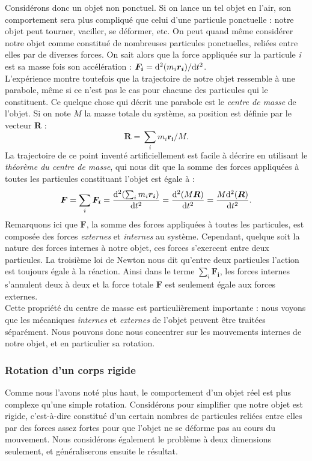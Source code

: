 Considérons donc un objet non ponctuel. Si on lance un tel objet en l'air, son comportement sera plus compliqué que celui d'une particule ponctuelle : notre objet peut tourner, vaciller, se déformer, etc. On peut quand même considérer notre objet comme constitué de nombreuses particules ponctuelles, reliées entre elles par de diverses forces. On sait alors que la force appliquée sur la particule \textit{i} est sa masse fois son accélération : $\bm{F_i} = \mathrm{d}^2(m_i\bm{r_i})/\mathrm{d} t^2$. \\L'expérience montre toutefois que la trajectoire de notre objet ressemble à une parabole, même si ce n'est pas le cas pour chacune des particules qui le constituent. Ce quelque chose qui décrit une parabole est le \textit{centre de masse} de l'objet. Si on note $M$ la masse totale du système, sa position est définie par le vecteur $\bm{R}$ :
\begin{equation*}
\bm{R} = \sum_i{m_i\bm{r_i}/M}.
\end{equation*}
La trajectoire de ce point inventé artificiellement est facile à décrire en utilisant le \textit{théorème du centre de masse}, qui nous dit que la somme des forces appliquées à toutes les particules constituant l'objet est égale à :
\begin{equation*}
\bm{F} = \sum_i{\bm{F_i}} = \frac{\mathrm{d}^2(\sum_i{m_i\bm{r_i}})}{\mathrm{d} t^2} = \frac{\mathrm{d}^2(M\bm{R})}{\mathrm{d} t^2} = \frac{M\mathrm{d}^2(\bm{R})}{\mathrm{d} t^2}.
\end{equation*}
Remarquons ici que $\bm{F}$, la somme des forces appliquées à toutes les particules, est composée des forces \textit{externes} et \textit{internes} au système. Cependant, quelque soit la nature des forces internes à notre objet, ces forces s'exercent entre deux particules. La troisième loi de Newton nous dit qu'entre deux particules l'action est toujours égale à la réaction. Ainsi dans le terme $\sum_i{\bm{F_i}}$, les forces internes s'annulent deux à deux et la force totale $\bm{F}$ est seulement égale aux forces externes.\\ Cette propriété du centre de masse est particulièrement importante : nous voyons que les mécaniques \textit{internes} et \textit{externes} de l'objet peuvent être traitées séparément. Nous pouvons donc nous concentrer sur les mouvements internes de notre objet, et en particulier sa rotation.

\subsubsection{Rotation d'un corps rigide}
Comme nous l'avons noté plus haut, le comportement d'un objet réel est plus complexe qu'une simple rotation. Considérons pour simplifier que notre objet est rigide, c'est-à-dire constitué d'un certain nombres de particules reliées entre elles par des forces assez fortes pour que l'objet ne se déforme pas au cours du mouvement. Nous considérons également le problème à deux dimensions seulement, et généraliserons ensuite le résultat.

